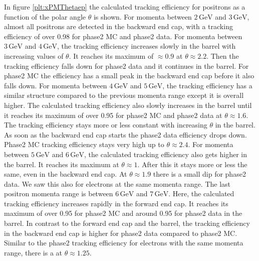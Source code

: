 \documentclass[a4paper,11pt,twosided,final,german,openbib,pdftex,listof=totoc,bibliography=totoc]{scrbook}
\begin{document}
In figure \ref{plt:xPMThetaep} the calculated tracking efficiency for positrons as a function of the polar angle $\theta$ is shown. For momenta between $2\,\textrm{GeV}$ and $3\,\textrm{GeV}$, almost all positrons are detected in the backward end cap, with a tracking efficiency of over 0.98 for phase2 MC and phase2 data. 
For momenta between $3\,\textrm{GeV}$ and $4\,\textrm{GeV}$, the tracking efficiency increases slowly in the barrel with increasing values of $\theta$. It reaches its maximum of $\approx 0.9$ at $\theta \approx 2.2$. Then the tracking efficiency falls down for phase2 data and it continues in the barrel. For phase2 MC the efficiency has a small peak in the backward end cap before it also falls down. 
For momenta between $4\,\textrm{GeV}$ and $5\,\textrm{GeV}$, the tracking efficiency has a similar structure compared to the previous momenta range except it is overall higher. The calculated tracking efficiency also slowly increases in the barrel until it reaches its maximum of over 0.95 for phase2 MC and phase2 data at $\theta \approx 1.6$. The tracking efficiency stays more or less constant with increasing $\theta$ in the barrel. As soon as the backward end cap starts the phase2 data efficiency drops down. Phase2 MC tracking efficiency stays very high up to $\theta \approx 2.4$.
For momenta between $5\,\textrm{GeV}$ and $6\,\textrm{GeV}$, the calculated tracking efficiency also gets higher in the barrel. It reaches its maximum at $\theta \approx 1$. After this it stays more or less the same, even in the backward end cap. At $\theta \approx 1.9$ there is a small dip for phase2 data. We saw this also for electrons at the same momenta range.
The last positron momenta range is between $6\,\textrm{GeV}$ and $7\,\textrm{GeV}$. Here, the calculated tracking efficiency increases rapidly in the forward end cap. It reaches its maximum of over 0.95 for phase2 MC and around 0.95 for phase2 data in the barrel. In contrast to the forward end cap and the barrel, the tracking efficiency in the backward end cap is higher for phase2 data compared to phase2 MC. Similar to the phase2 tracking efficiency for electrons with the same momenta range, there is a at $\theta \approx 1.25$.
\end{document}
